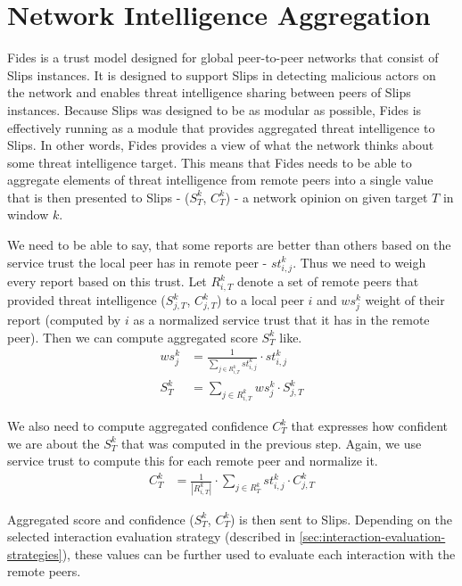 \section{Network Intelligence Aggregation}
\label{sec:network-intelligence-aggregation}
Fides is a trust model designed for global peer-to-peer networks that  consist of Slips instances.
It is designed to support Slips in detecting malicious actors on the network and enables threat intelligence sharing between peers of Slips instances.
Because Slips was designed to be as modular as possible, Fides is effectively running as a module that provides aggregated threat intelligence to Slips. 
In other words, Fides provides a view of what the network thinks about some threat intelligence target.
This means that Fides needs to be able to aggregate elements of threat intelligence from remote peers into a single value that is then presented to Slips - ($S^{k}_{T}$, $C^{k}_{T}$) - a network opinion on given target $T$ in window $k$.

We need to be able to say, that some reports are better than others based on the service trust the local peer has in remote peer - $st^{k}_{i, j}$.
Thus we need to weigh every report based on this trust.
Let $R^{k}_{i, T}$ denote a set of remote peers that provided threat intelligence ($S^{k}_{j, T}$, $C^{k}_{j, T}$) to a local peer $i$ and $ws^{k}_{j}$ weight of their report (computed by $i$ as a normalized service trust that it has in the remote peer).
Then we can compute aggregated score $S^{k}_{T}$ like.
\begin{equation}
\begin{split}
    ws^{k}_{j} &= \frac{1}{\sum_{{j}\in R^{k}_{i, T}} st^{k}_{i, j}} \cdot st^{k}_{i, j} \\
    S^{k}_{T} &= \sum_{{j}\in R^{k}_{i, T}} ws^{k}_{j} \cdot S^{k}_{j, T}
\end{split}
\end{equation}

We also need to compute aggregated confidence $C^{k}_{T}$ that expresses how confident we are about the $S^{k}_{T}$ that was computed in the previous step.
Again, we use service trust to compute this for each remote peer and normalize it. 
\begin{equation}
\begin{split}
    C^{k}_{T} &= \frac{1}{|R^{k}_{i, T}|} \cdot \sum_{{j}\in R^{k}_{T}} st^{k}_{i, j} \cdot C^{k}_{j, T}
\end{split}
\end{equation}

\noindent 
Aggregated score and confidence ($S^{k}_{T}$, $C^{k}_{T}$) is then sent to Slips.
Depending on the selected interaction evaluation strategy (described in \ref{sec:interaction-evaluation-strategies}), these values can be further used to evaluate each interaction with the remote peers.